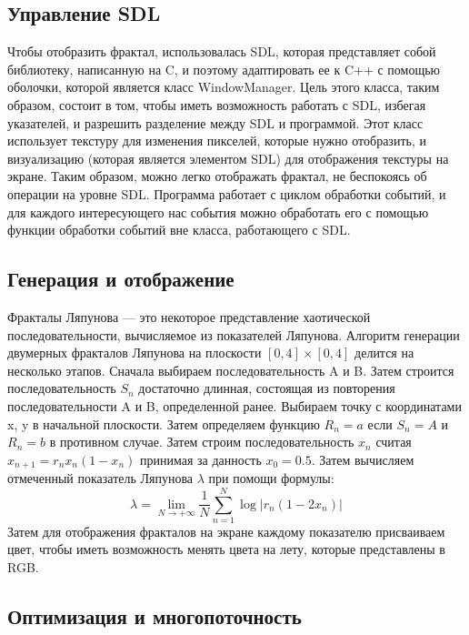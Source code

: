 \documentclass[a5paper,10pt, twoside]{article} %
\begin{document}
  \subsection{Управление SDL}

  Чтобы отобразить фрактал, использовалась SDL, которая представляет собой библиотеку, написанную на C, 
  и поэтому адаптировать ее к C++ с помощью оболочки, которой является класс WindowManager.
  Цель этого класса, таким образом, состоит в том, чтобы иметь возможность работать с SDL, избегая указателей, 
  и разрешить разделение между SDL и программой.
  Этот класс использует текстуру для изменения пикселей, которые нужно отобразить, и визуализацию 
  (которая является элементом SDL) для отображения текстуры на экране.
  Таким образом, можно легко отображать фрактал, не беспокоясь об операции на уровне SDL.
  Программа работает с циклом обработки событий, и для каждого интересующего нас события 
  можно обработать его с помощью функции обработки событий вне класса, работающего с SDL.

  \subsection{Генерация и отображение}

	Фракталы Ляпунова — это некоторое представление хаотической последовательности, вычисляемое из показателей Ляпунова.
	Алгоритм генерации двумерных фракталов Ляпунова на плоскости $[0,4] \times [0,4]$ делится на несколько этапов.
	Сначала выбираем последовательность A и B.
	Затем строится последовательность $S_n$ достаточно длинная, состоящая из повторения последовательности A и B, определенной ранее.
	Выбираем точку с координатами x, y в начальной плоскости.
	Затем определяем функцию $R_n = a$ если $ S_n = A $ и $R_n = b$ в противном случае.
	Затем строим последовательность $x_n$ считая $x_{{n+1}}=r_{n}x_{n}(1-x_{n})$ принимая за данность $x_0 = 0.5$.
	Затем вычисляем отмеченный показатель Ляпунова $\lambda$ при помощи формулы:
	\[\lambda = \lim_{N \to +\infty} \frac{1}{N} \sum_{n=1}^{N} \log | r_n(1-2x_n) |\]
	Затем для отображения фракталов на экране каждому показателю присваиваем цвет, чтобы иметь возможность 
  менять цвета на лету, которые представлены в RGB.

  \subsection{Оптимизация и многопоточность}
\end{document}
